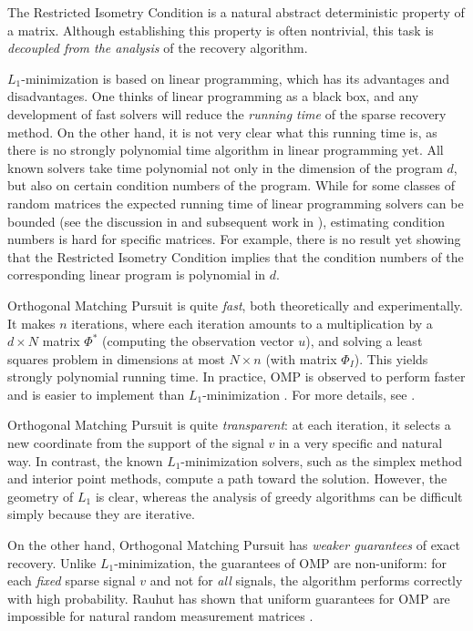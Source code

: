 \documentclass[12pt]{amsart}
\theoremstyle{plain}
\theoremstyle{definition}
\theoremstyle{remark}
\numberwithin{equation}{section}
\begin{document}
The Restricted Isometry Condition is a natural abstract deterministic property 
of a matrix. Although establishing this property is often nontrivial, 
this task is {\em decoupled from the analysis} of the recovery algorithm.

$L_1$-minimization is based on linear programming, which has its advantages
and disadvantages. One thinks of linear programming as a black box, 
and any development of fast solvers will reduce the {\em running time} of 
the sparse recovery method. On the other hand, it is not very clear what this running time is, 
as there is no strongly polynomial time algorithm 
in linear programming yet. All known solvers take time polynomial not only in 
the dimension of the program $d$, but also on certain condition numbers of the program.
While for some classes of random matrices the expected running time of linear 
programming solvers can be bounded (see the discussion in \cite{ST} and 
subsequent work in \cite{V}), estimating
condition numbers is hard for specific matrices. For example, there is no result
yet showing that the Restricted Isometry Condition implies that the condition numbers
of the corresponding linear program is polynomial in $d$.

Orthogonal Matching Pursuit is quite {\em fast}, both theoretically and experimentally.
It makes $n$ iterations, where each 
iteration amounts to a multiplication by a $d \times N$ matrix $\Phi^*$
(computing the observation vector $u$), and solving a least squares problem 
in dimensions at most $N \times n$ (with matrix $\Phi_I$). This yields strongly 
polynomial running time. In practice, OMP is observed to perform faster and 
is easier to implement than $L_1$-minimization \cite{TG}.
For more details, see \cite{TG}.

Orthogonal Matching Pursuit is quite {\em transparent}: at each iteration, it
selects a new coordinate from the support of the signal $v$ in a very specific and 
natural way. In contrast, the known $L_1$-minimization solvers, such as the 
simplex method and interior point methods, compute a path toward the solution. 
However, the geometry of $L_1$ is clear, whereas the analysis of greedy algorithms
can be difficult simply because they are iterative.

On the other hand, Orthogonal Matching Pursuit has {\em weaker guarantees} of 
exact recovery. Unlike $L_1$-minimization, the guarantees of OMP are non-uniform:
for each {\em fixed} sparse signal $v$ and not for {\em all} signals, 
the algorithm performs correctly with high probability. 
Rauhut has shown that uniform guarantees for OMP are impossible for natural 
random measurement matrices \cite{R}.
\end{document}

